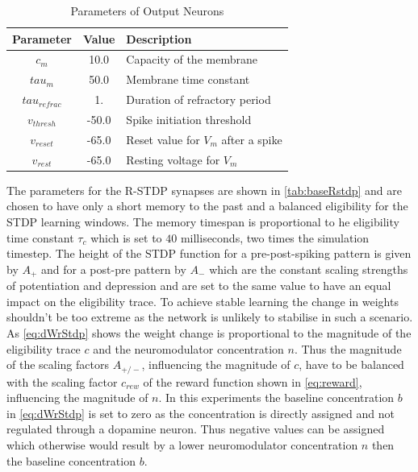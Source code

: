 \begin{table}[htpb]
  \caption[Parameters Output Neuron]{Parameters of Output Neurons} \label{tab:outputParam}
  \centering
  \begin{tabular}{|c| c |l|}
      \toprule
      Parameter & Value & Description \\
      \midrule
      $c_m$   & 10.0  & Capacity of the membrane \\
      $tau_{m}$    & 50.0  & Membrane time constant \\
      $tau_{refrac}$   & 1.  & Duration of refractory period\\
      $v_{thresh}$   & -50.0  & Spike initiation threshold \\
      $v_{reset}$    & -65.0  &  Reset value for $V_m$ after a spike \\
      $v_{rest}$ & -65.0 & Resting voltage for $V_m$ \\
      \bottomrule
  \end{tabular}
  \end{table}

The parameters for the R-STDP synapses are shown in \autoref{tab:baseRstdp} and are chosen to have only a short memory to the past and a balanced eligibility for the STDP learning windows. The memory timespan is proportional to he eligibility time constant $\tau_c$ which is set to $40$ milliseconds, two times the simulation timestep. The height of the STDP function for a pre-post-spiking pattern is given by $A_+$ and for a post-pre pattern by $A_-$ which are the constant scaling strengths of potentiation and depression and are set to the same value to have an equal impact on the eligibility trace. To achieve stable learning the change in weights shouldn’t be too extreme as the network is unlikely to stabilise in such a scenario. As \autoref{eq:dWrStdp} shows the weight change is proportional to the magnitude of the eligibility trace $c$ and the neuromodulator concentration $n$. Thus the magnitude of the scaling factors $A_{+/-}$, influencing the magnitude of $c$,  have to be balanced with the scaling factor $c_{rew}$ of the reward function shown in \autoref{eq:reward}, influencing the magnitude of $n$. In this experiments the baseline concentration $b$ in \autoref{eq:dWrStdp} is set to zero as the concentration is directly assigned and not regulated through a dopamine neuron. Thus negative values can be assigned which otherwise would result by a lower neuromodulator concentration $n$ then the baseline concentration $b$.

